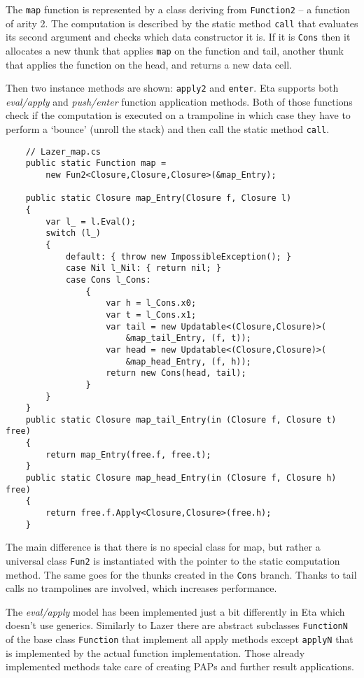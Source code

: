 \documentclass[en]{pracamgr}
\begin{document}
The \texttt{map} function is represented by a class deriving
from \texttt{Function2} -- a function of arity 2.
The computation is described by the static method \texttt{call}
that evaluates its second argument and checks which data
constructor it is. If it is \texttt{Cons} then it
allocates a new thunk that applies \texttt{map} on the function and tail, another thunk that applies the
function on the head, and returns a new data cell.

Then two instance methods are shown: \texttt{apply2} and \texttt{enter}.
Eta supports both \textit{eval/apply} and \textit{push/enter}
function application methods.
Both of those functions check if the computation is
executed on a trampoline in which case they have to
perform a `bounce' (unroll the stack)
and then call the static method \texttt{call}.

\begin{verbatim}
    // Lazer_map.cs
    public static Function map = 
        new Fun2<Closure,Closure,Closure>(&map_Entry);

    public static Closure map_Entry(Closure f, Closure l)
    {
        var l_ = l.Eval();
        switch (l_)
        {
            default: { throw new ImpossibleException(); }
            case Nil l_Nil: { return nil; }
            case Cons l_Cons:
                {
                    var h = l_Cons.x0;
                    var t = l_Cons.x1;
                    var tail = new Updatable<(Closure,Closure)>(
                        &map_tail_Entry, (f, t));
                    var head = new Updatable<(Closure,Closure)>(
                        &map_head_Entry, (f, h));
                    return new Cons(head, tail);
                }
        }
    }
    public static Closure map_tail_Entry(in (Closure f, Closure t) free)
    {
        return map_Entry(free.f, free.t);
    }
    public static Closure map_head_Entry(in (Closure f, Closure h) free)
    {
        return free.f.Apply<Closure,Closure>(free.h);
    }
\end{verbatim}

The main difference is that there is no special class for map,
but rather a universal class \texttt{Fun2} is instantiated
with the pointer to the static computation method.
The same goes for the thunks created in the \texttt{Cons} branch.
Thanks to tail calls no trampolines are involved, which
increases performance.

The \textit{eval/apply} model has been implemented just a bit differently
in Eta which doesn't use generics.
Similarly to Lazer there are abstract subclasses \texttt{FunctionN}
of the base class \texttt{Function} that implement all
apply methods except \texttt{applyN} that is implemented
by the actual function implementation.
Those already implemented methods take care of creating
PAPs and further result applications.
\end{document}
